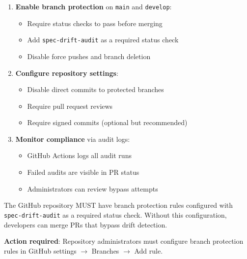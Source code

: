 \begin{enumerate}
  \item \textbf{Enable branch protection} on \texttt{main} and \texttt{develop}:
    \begin{itemize}
      \item Require status checks to pass before merging
      \item Add \texttt{spec-drift-audit} as a required status check
      \item Disable force pushes and branch deletion
    \end{itemize}
  
  \item \textbf{Configure repository settings}:
    \begin{itemize}
      \item Disable direct commits to protected branches
      \item Require pull request reviews
      \item Require signed commits (optional but recommended)
    \end{itemize}
  
  \item \textbf{Monitor compliance} via audit logs:
    \begin{itemize}
      \item GitHub Actions logs all audit runs
      \item Failed audits are visible in PR status
      \item Administrators can review bypass attempts
    \end{itemize}
\end{enumerate}

\begin{tcolorbox}[colback=yellow!5,colframe=yellow!70,title=\faIcon{exclamation-triangle} Enforcement Configuration Required]
The GitHub repository MUST have branch protection rules configured with
\texttt{spec-drift-audit} as a required status check. Without this
configuration, developers can merge PRs that bypass drift detection.

\textbf{Action required}: Repository administrators must configure branch
protection rules in GitHub settings $\rightarrow$ Branches $\rightarrow$ Add rule.
\end{tcolorbox}
